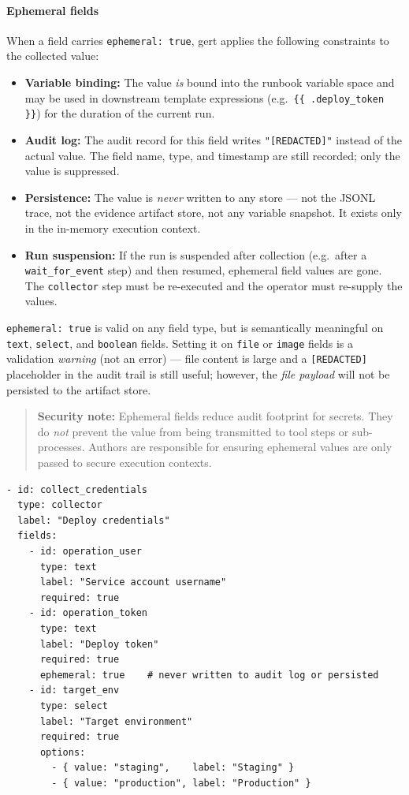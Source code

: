 \paragraph{Ephemeral fields}
\label{par:ephemeral-fields}

When a field carries \texttt{ephemeral: true}, gert applies the following
constraints to the collected value:

\begin{itemize}
  \item \textbf{Variable binding:} The value \emph{is} bound into the runbook
        variable space and may be used in downstream template expressions (e.g.\
        \texttt{\{\{ .deploy\_token \}\}}) for the duration of the current run.
  \item \textbf{Audit log:} The audit record for this field writes
        \texttt{"[REDACTED]"} instead of the actual value.  The field name,
        type, and timestamp are still recorded; only the value is suppressed.
  \item \textbf{Persistence:} The value is \emph{never} written to any store —
        not the JSONL trace, not the evidence artifact store, not any variable
        snapshot.  It exists only in the in-memory execution context.
  \item \textbf{Run suspension:} If the run is suspended after collection (e.g.\
        after a \texttt{wait\_for\_event} step) and then resumed, ephemeral
        field values are gone.  The \texttt{collector} step must be re-executed
        and the operator must re-supply the values.
\end{itemize}

\texttt{ephemeral: true} is valid on any field type, but is semantically
meaningful on \texttt{text}, \texttt{select}, and \texttt{boolean} fields.
Setting it on \texttt{file} or \texttt{image} fields is a validation
\emph{warning} (not an error) — file content is large and a
\texttt{[REDACTED]} placeholder in the audit trail is still useful; however,
the \emph{file payload} will not be persisted to the artifact store.

\begin{quote}
\textbf{Security note:} Ephemeral fields reduce audit footprint for secrets.
They do \emph{not} prevent the value from being transmitted to tool steps or
sub-processes.  Authors are responsible for ensuring ephemeral values are only
passed to secure execution contexts.
\end{quote}

\begin{verbatim}
- id: collect_credentials
  type: collector
  label: "Deploy credentials"
  fields:
    - id: operation_user
      type: text
      label: "Service account username"
      required: true
    - id: operation_token
      type: text
      label: "Deploy token"
      required: true
      ephemeral: true    # never written to audit log or persisted
    - id: target_env
      type: select
      label: "Target environment"
      required: true
      options:
        - { value: "staging",    label: "Staging" }
        - { value: "production", label: "Production" }
\end{verbatim}

